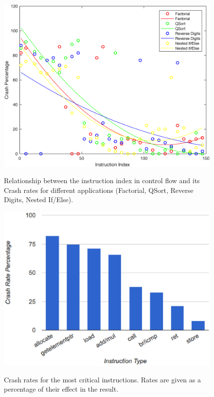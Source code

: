 \begin{figure}[!t]
\begin{center}
\label{fig:plan_5}\includegraphics[scale=0.3]{./figures/figure_3_33.eps}
\end{center}
\caption{Relationship between the instruction index in control flow and its Crash rates for different applications (Factorial, QSort, Reverse Digits, Nested If/Else).}
\label{fig:plan_5}
\end{figure}

\begin{figure}[!t]
\begin{center}
\label{fig:plan_9}\includegraphics[scale=0.39]{./figures/crash_type_2.eps}
\end{center}
\caption{Crash rates for the most critical instructions. Rates are given as a percentage of their effect in the result.}
\label{fig:plan_9}
\end{figure}

